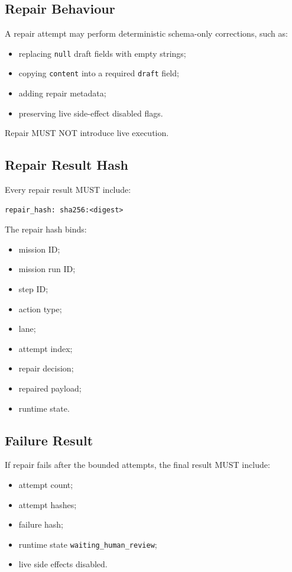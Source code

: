 \subsection{Repair Behaviour}

A repair attempt may perform deterministic schema-only corrections, such as:

\begin{itemize}
  \item replacing \texttt{null} draft fields with empty strings;
  \item copying \texttt{content} into a required \texttt{draft} field;
  \item adding repair metadata;
  \item preserving live side-effect disabled flags.
\end{itemize}

Repair MUST NOT introduce live execution.

\subsection{Repair Result Hash}

Every repair result MUST include:

\begin{verbatim}
repair_hash: sha256:<digest>
\end{verbatim}

The repair hash binds:

\begin{itemize}
  \item mission ID;
  \item mission run ID;
  \item step ID;
  \item action type;
  \item lane;
  \item attempt index;
  \item repair decision;
  \item repaired payload;
  \item runtime state.
\end{itemize}

\subsection{Failure Result}

If repair fails after the bounded attempts, the final result MUST include:

\begin{itemize}
  \item attempt count;
  \item attempt hashes;
  \item failure hash;
  \item runtime state \texttt{waiting\_human\_review};
  \item live side effects disabled.
\end{itemize}


